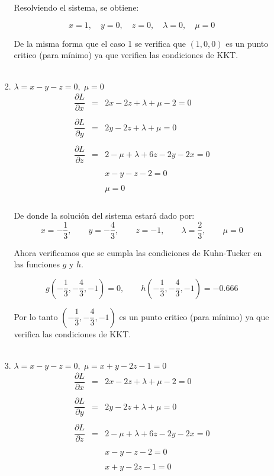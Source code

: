 \begin{enumerate}
\begin{enumerate}[\bfseries a)]
\begin{enumerate}[1.]
			Resolviendo el sistema, se obtiene:

			$$x=1,\quad y=0,\quad z=0,\quad \lambda=0,\quad \mu=0$$

			De la misma forma que el caso 1 se verifica que $(1,0,0)$ es un punto critico (para mínimo) ya que verifica las condiciones de KKT. \\\\


		    \item $\lambda = x-y-z=0,\; \mu = 0$\\

			$$\begin{array}{rcl}
			    \dfrac{\partial L}{\partial x}&=&2x-2z+\lambda + \mu -2 = 0\\\\
			    \dfrac{\partial L}{\partial y}&=&2y-2z+\lambda + \mu = 0\\\\
			    \dfrac{\partial L}{\partial z}&=&2-\mu + \lambda +6z-2y-2x=0\\\\
							  &&x-y-z-2= 0\\\\
							  &&\mu= 0\\\\
			\end{array}$$

			De donde la solución del sistema estará dado por:
			$$x=-\dfrac{1}{3},\qquad y=-\dfrac{4}{3},\qquad z=-1,\qquad \lambda = \dfrac{2}{3},\qquad \mu=0$$

			Ahora verificamos que se cumpla las condiciones de Kuhn-Tucker en las funciones $g$ y $h$.

			$$g\left(-\dfrac{1}{3},-\dfrac{4}{3},-1\right)=0,\qquad h\left(-\dfrac{1}{3},-\dfrac{4}{3},-1\right)=-0.666$$

			Por lo tanto $(-\dfrac{1}{3},-\dfrac{4}{3},-1)$ es un punto critico (para mínimo) ya que verifica las condiciones de KKT.\\\\


		    \item $\lambda = x-y-z=0,\; \mu = x+y-2z-1=0$\\

			$$\begin{array}{rcl}
			    \dfrac{\partial L}{\partial x}&=&2x-2z+\lambda + \mu -2 = 0\\\\
			    \dfrac{\partial L}{\partial y}&=&2y-2z+\lambda + \mu = 0\\\\
			    \dfrac{\partial L}{\partial z}&=&2-\mu + \lambda +6z-2y-2x=0\\\\
							  &&x-y-z-2= 0\\\\
							  &&x+y-2z-1 = 0\\\\
			\end{array}$$


\end{enumerate}
\end{enumerate}
\end{enumerate}
